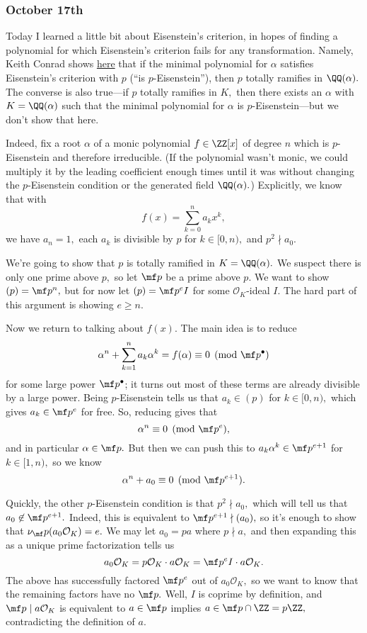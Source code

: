 \subsubsection{October 17th}
Today I learned a little bit about Eisenstein's criterion, in hopes of finding a polynomial for which Eisenstein's criterion fails for any transformation. Namely, Keith Conrad shows \href{https://kconrad.math.uconn.edu/blurbs/gradnumthy/totram.pdf}{here} that if the minimal polynomial for $\alpha$ satisfies Eisenstein's criterion with $p$ (``is $p$-Eisenstein''), then $p$ totally ramifies in $\QQ(\alpha).$ The converse is also true---if $p$ totally ramifies in $K,$ then there exists an $\alpha$ with $K=\QQ(\alpha)$ such that the minimal polynomial for $\alpha$ is $p$-Eisenstein---but we don't show that here.

Indeed, fix a root $\alpha$ of a monic polynomial $f\in\ZZ[x]$ of degree $n$ which is $p$-Eisenstein and therefore irreducible. (If the polynomial wasn't monic, we could multiply it by the leading coefficient enough times until it was without changing the $p$-Eisenstein condition or the generated field $\QQ(\alpha).$) Explicitly, we know that with
\[f(x)=\sum_{k=0}^na_kx^k,\]
we have $a_n=1,$ each $a_k$ is divisible by $p$ for $k\in[0,n),$ and $p^2\nmid a_0.$

We're going to show that $p$ is totally ramified in $K=\QQ(\alpha).$ We suspect there is only one prime above $p,$ so let $\mf p$ be a prime above $p.$ We want to show $(p)=\mf p^n,$ but for now let $(p)=\mf p^eI$ for some $\mathcal O_K$-ideal $I.$ The hard part of this argument is showing $e\ge n.$

Now we return to talking about $f(x).$ The main idea is to reduce
\[\alpha^n+\sum_{k=1}^na_k\alpha^k=f(\alpha)\equiv0\pmod{\mf p^\bullet}\]
for some large power $\mf p^\bullet$; it turns out most of these terms are already divisible by a large power. Being $p$-Eisenstein tells us that $a_k\in(p)$ for $k\in[0,n),$ which gives $a_k\in\mf p^e$ for free. So, reducing gives that
\[\alpha^n\equiv0\pmod{\mf p^e},\]
and in particular $\alpha\in\mf p.$ But then we can push this to $a_k\alpha^k\in\mf p^{e+1}$ for $k\in[1,n),$ so we know
\[\alpha^n+a_0\equiv0\pmod{\mf p^{e+1}}.\]

Quickly, the other $p$-Eisenstein condition is that $p^2\nmid a_0,$ which will tell us that $a_0\not\in\mf p^{e+1}.$ Indeed, this is equivalent to $\mf p^{e+1}\nmid(a_0),$ so it's enough to show that $\nu_\mf p(a_0\mathcal O_K)=e.$ We may let $a_0=pa$ where $p\nmid a,$ and then expanding this as a unique prime factorization tells us
\[a_0\mathcal O_K=p\mathcal O_K\cdot a\mathcal O_K=\mf p^eI\cdot a\mathcal O_K.\]
The above has successfully factored $\mf p^e$ out of $a_0\mathcal O_K,$ so we want to know that the remaining factors have no $\mf p.$ Well, $I$ is coprime by definition, and $\mf p\mid a\mathcal O_K$ is equivalent to $a\in\mf p$ implies $a\in\mf p\cap\ZZ=p\ZZ,$ contradicting the definition of $a.$

